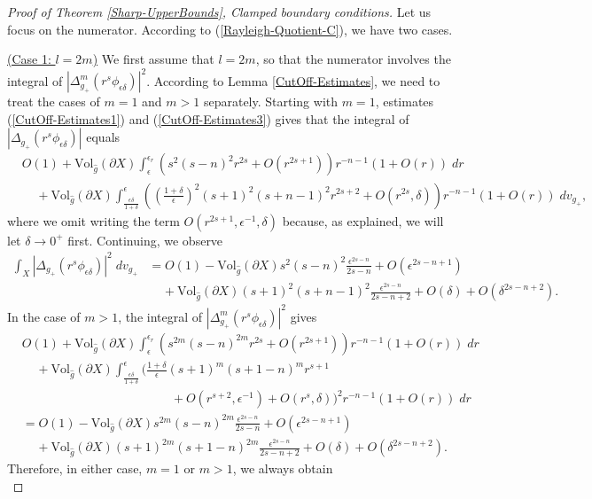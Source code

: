 \documentclass{amsart}
\newcommand{\Vol}{\text{Vol}}
\newcommand{\D}{\delta}
\newcommand{\E}{\epsilon}
\begin{document}
\begin{proof}[Proof of Theorem \ref{Sharp-UpperBounds}, Clamped boundary conditions]
    
    Let us focus on the numerator. According to (\ref{Rayleigh-Quotient-C}), we have two cases.

    \vspace{.15in}
    \underline{(Case 1: $l=2m$)} We first assume that $l=2m$, so that the numerator involves the integral of $|\Delta^m_{g_+}(r^s\phi_{\E\D})|^2$. According to Lemma \ref{CutOff-Estimates}, we need to treat the cases of $m=1$ and $m>1$ separately. Starting with $m=1$, estimates (\ref{CutOff-Estimates1}) and (\ref{CutOff-Estimates3}) gives that the integral of $|\Delta_{g_+}(r^s\phi_{\E\D})|$ equals
    \[
    \begin{split}
        &O(1)+\Vol_{\hat g}(\partial X)\int_\E^{\E_r}(s^{2}(s-n)^{2}r^{2s}+O(r^{2s+1}))r^{-n-1}(1+O(r))\;dr \\&\;\;\;\;+ \Vol_{\hat g}(\partial X)\int_{\frac{\E\D}{1+\D}}^\E \left(\left(\frac{1+\D}{\E}\right)^2(s+1)^2(s+n-1)^2r^{2s+2} + O(r^{2s},\D)\right)r^{-n-1}(1+O(r))\;dv_{g_+},
    \end{split}
    \]
    where we omit writing the term $O(r^{2s+1},\E^{-1},\D)$ because, as explained, we will let $\D\to0^+$ first. Continuing, we observe
    \[
    \begin{split}
        \int_X|\Delta_{g_+}(r^s\phi_{\E\D})|^2\;dv_{g_+} &= O(1) - \Vol_{\hat g}(\partial X)s^2(s-n)^2\frac{\E^{2s-n}}{2s-n} + O(\E^{2s-n+1}) \\&\;\;\;\;+\Vol_{\hat g}(\partial X)(s+1)^2(s+n-1)^2\frac{\E^{2s-n}}{2s-n+2} + O(\D) + O(\D^{2s-n+2}).
    \end{split}
    \]
    In the case of $m>1$, the integral of $|\Delta^m_{g_+}(r^s\phi_{\E\D})|^2$ gives
    \[
    \begin{split}
 &O(1) + \Vol_{\hat g}(\partial X)\int_\E^{\E_r}(s^{2m}(s-n)^{2m}r^{2s}+O(r^{2s+1}))r^{-n-1}(1+O(r))\;dr\\&\;\;\;\;+\Vol_{\hat g}(\partial X)\int_{\frac{\E\D}{1+\D}}^\E \Bigg(\frac{1+\D}{\E}(s+1)^m(s+1-n)^mr^{s+1} \\&\hspace{2in}+ O(r^{s+2},\E^{-1}) + O(r^s,\D)\Bigg)^2 r^{-n-1}(1+O(r))\;dr \\ &= O(1) - \Vol_{\hat g}(\partial X)s^{2m}(s-n)^{2m} \frac{\E^{2s-n}}{2s-n} + O(\E^{2s-n+1})\\&\;\;\;\;+\Vol_{\hat g}(\partial X)(s+1)^{2m}(s+1-n)^{2m}\frac{\E^{2s-n}}{2s-n+2} +O(\D)+O(\D^{2s-n+2}).
    \end{split}
    \]
    Therefore, in either case, $m=1$ or $m>1$, we always obtain
    \begin{equation}\label{Sharp-UB-Clamped2}

\end{equation}
\end{proof}
\end{document}
